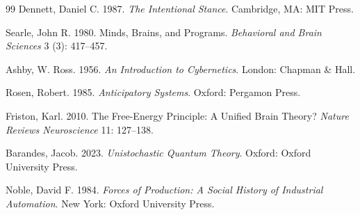 \documentclass[11pt]{article}
\theoremstyle{remark}
\begin{document}
\begin{thebibliography}{99}
Dennett, Daniel C. 1987.
\textit{The Intentional Stance}.
Cambridge, MA: MIT Press.

Searle, John R. 1980.
Minds, Brains, and Programs.
\textit{Behavioral and Brain Sciences} 3 (3): 417--457.

Ashby, W. Ross. 1956.
\textit{An Introduction to Cybernetics}.
London: Chapman \& Hall.

Rosen, Robert. 1985.
\textit{Anticipatory Systems}.
Oxford: Pergamon Press.

Friston, Karl. 2010.
The Free-Energy Principle: A Unified Brain Theory?
\textit{Nature Reviews Neuroscience} 11: 127--138.

Barandes, Jacob. 2023.
\textit{Unistochastic Quantum Theory}.
Oxford: Oxford University Press.

Noble, David F. 1984.
\textit{Forces of Production: A Social History of Industrial Automation}.
New York: Oxford University Press.

\end{thebibliography}
\end{document}
